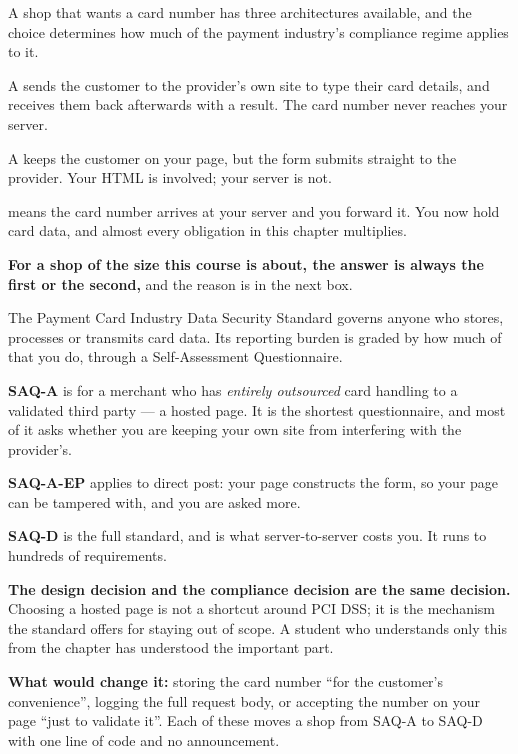 A shop that wants a card number has three architectures available, and the
choice determines how much of the payment industry's compliance regime applies
to it.

\begin{definitionbox}
A  sends the customer to the provider's own site to type
their card details, and receives them back afterwards with a result. The card
number never reaches your server.

\smallskip
A  keeps the customer on your page, but the form submits
straight to the provider. Your HTML is involved; your server is not.

\smallskip
{} means the card number arrives at your server and you
forward it. You now hold card data, and almost every obligation in this chapter
multiplies.

\smallskip
\textbf{For a shop of the size this course is about, the answer is always the
first or the second,} and the reason is in the next box.
\end{definitionbox}

\begin{conceptbox}
The Payment Card Industry Data Security Standard governs anyone who stores,
processes or transmits card data. Its reporting burden is graded by how much of
that you do, through a Self-Assessment Questionnaire.

\begin{tight}
  \item \textbf{SAQ-A} is for a merchant who has \emph{entirely outsourced} card
        handling to a validated third party --- a hosted page. It is the
        shortest questionnaire, and most of it asks whether you are keeping
        your own site from interfering with the provider's.
  \item \textbf{SAQ-A-EP} applies to direct post: your page constructs the form,
        so your page can be tampered with, and you are asked more.
  \item \textbf{SAQ-D} is the full standard, and is what server-to-server costs
        you. It runs to hundreds of requirements.
\end{tight}

\smallskip
\textbf{The design decision and the compliance decision are the same
decision.} Choosing a hosted page is not a shortcut around PCI DSS; it is the
mechanism the standard offers for staying out of scope. A student who
understands only this from the chapter has understood the important part.

\smallskip
\textbf{What would change it:} storing the card number ``for the customer's
convenience'', logging the full request body, or accepting the number on your
page ``just to validate it''. Each of these moves a shop from SAQ-A to SAQ-D
with one line of code and no announcement.
\end{conceptbox}

